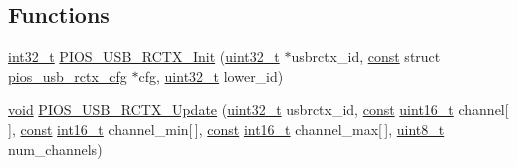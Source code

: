 \subsection*{Functions}
\begin{DoxyCompactItemize}
\item 
\hyperlink{group___n_a_m_e_gafd12020da5a235dfcf0c3c748fb5baed}{int32\-\_\-t} \hyperlink{group___p_i_o_s___u_s_b___r_c_t_x_ga335e2cdbbb185681f189b0f030bd712c}{P\-I\-O\-S\-\_\-\-U\-S\-B\-\_\-\-R\-C\-T\-X\-\_\-\-Init} (\hyperlink{stdint_8h_a435d1572bf3f880d55459d9805097f62}{uint32\-\_\-t} $\ast$usbrctx\-\_\-id, \hyperlink{group___n_a_m_e_ga7ae6d0e43244213b34de2c2b9aa30da6}{const} struct \hyperlink{structpios__usb__rctx__cfg}{pios\-\_\-usb\-\_\-rctx\-\_\-cfg} $\ast$cfg, \hyperlink{stdint_8h_a435d1572bf3f880d55459d9805097f62}{uint32\-\_\-t} lower\-\_\-id)
\item 
\hyperlink{group___n_a_m_e_ga18028b8badbf1ea7e704ccac3c488e82}{void} \hyperlink{group___p_i_o_s___u_s_b___r_c_t_x_gaf82632897875fdc4d211a82e7ffb1103}{P\-I\-O\-S\-\_\-\-U\-S\-B\-\_\-\-R\-C\-T\-X\-\_\-\-Update} (\hyperlink{stdint_8h_a435d1572bf3f880d55459d9805097f62}{uint32\-\_\-t} usbrctx\-\_\-id, \hyperlink{group___n_a_m_e_ga7ae6d0e43244213b34de2c2b9aa30da6}{const} \hyperlink{stdint_8h_a273cf69d639a59973b6019625df33e30}{uint16\-\_\-t} channel\mbox{[}$\,$\mbox{]}, \hyperlink{group___n_a_m_e_ga7ae6d0e43244213b34de2c2b9aa30da6}{const} \hyperlink{stdint_8h_aa343fa3b3d06292b959ffdd4c4703b06}{int16\-\_\-t} channel\-\_\-min\mbox{[}$\,$\mbox{]}, \hyperlink{group___n_a_m_e_ga7ae6d0e43244213b34de2c2b9aa30da6}{const} \hyperlink{stdint_8h_aa343fa3b3d06292b959ffdd4c4703b06}{int16\-\_\-t} channel\-\_\-max\mbox{[}$\,$\mbox{]}, \hyperlink{stdint_8h_aba7bc1797add20fe3efdf37ced1182c5}{uint8\-\_\-t} num\-\_\-channels)
\end{DoxyCompactItemize}
